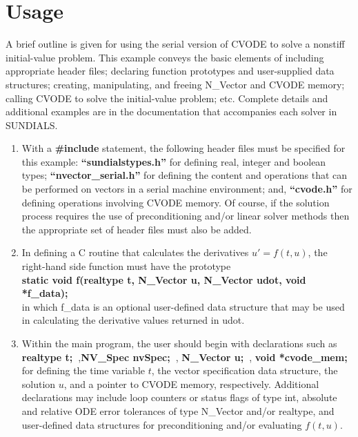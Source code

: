 \section{Usage}
\label{s:usage}

A brief outline is given for using the serial version of CVODE to solve
a nonstiff initial-value problem.
This example conveys the basic elements of including appropriate
header files; declaring function prototypes and user-supplied data
structures; creating, manipulating, and freeing N\_Vector and CVODE
memory; 
calling CVODE to solve the initial-value problem; etc.
Complete details and additional examples are in the documentation that
accompanies each solver in SUNDIALS.

\begin{enumerate}
\item With a {\bf \#include} statement, the following header files must be
specified for this example: {\bf ``sundialstypes.h''} for defining
real, integer and boolean types; {\bf ``nvector\_serial.h''} for
defining the content and operations that can be performed on vectors
in a serial machine environment; and, {\bf ``cvode.h''} for defining
operations involving CVODE memory. Of course, if the solution process
requires the use of preconditioning and/or linear solver methods then
the appropriate set of header files must also be added.

\item In defining a C routine that calculates the derivatives
$u'=f(t,u)$, the right-hand side function must have the prototype \\
{\bf static void f(realtype t, N\_Vector u, N\_Vector udot, void
*f\_data);} \\
in which {f\_data} is an optional user-defined data structure
that may be used in calculating the derivative values returned in {udot}.

\item Within the main program, the user should begin with declarations such as
\\
{\bf realtype t;~},{\bf NV\_Spec nvSpec;~}, {\bf N\_Vector u;~}, {\bf
void *cvode\_mem;~} \\
for defining the time variable $t$, the vector specification data structure, the
solution $u$, and a pointer to CVODE memory, respectively.
Additional declarations may include loop counters or status flags of
type {int}, absolute and relative ODE error tolerances of type
{N\_Vector} and/or {realtype}, and user-defined data structures
for preconditioning and/or evaluating $f(t,u)$.


\end{enumerate}

